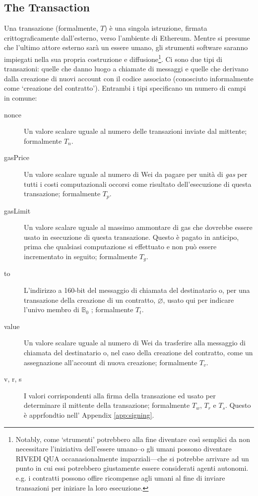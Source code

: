 \documentclass[9pt,oneside]{amsart}
\makeatletter
\newcommand*\eg{e.g.\@\xspace}
\makeatother
\begin{document}
\begin{multicols}{2}
\subsection{The Transaction} \label{ch:transaction}

Una transazione (formalmente, $T$) è una singola istruzione, firmata crittograficamente dall'esterno, verso l'ambiente di Ethereum. Mentre si presume che l'ultimo attore esterno sarà un essere umano, gli strumenti software saranno impiegati nella sua propria costruzione e diffusione\footnote{Notably, come `strumenti' potrebbero alla fine diventare così semplici da non necessitare l'iniziativa dell'essere umano--o gli umani possono diventare RIVEDI QUA occanasionalmente imparziali---che si potrebbe arrivare ad un punto in cui essi potrebbero giustamente essere considerati agenti autonomi. \eg i contratti possono offire ricompense agli umani al fine di inviare transazioni per iniziare la loro esecuzione.}. Ci sono due tipi di transazioni: quelle che danno luogo a chiamate di messaggi e quelle che derivano dalla creazione di nuovi account con il codice associato (conosciuto informalmente come `creazione del contratto'). Entrambi i tipi specificano un numero di campi in comune:

\begin{description}
\item[nonce] Un valore scalare uguale al numero delle transazioni inviate dal mittente; formalmente $T_n$.
\item[gasPrice] Un valore scalare uguale al numero di Wei da pagare per unità di \textit{gas} per tutti i costi computazionali occorsi come risultato dell'esecuzione di questa transazione; formalmente $T_p$.
\item[gasLimit] Un valore scalare uguale al massimo ammontare di gas che dovrebbe essere usato in esecuzione di questa transazione. Questo è pagato in anticipo, prima che qualsiasi computazione si effettuato e non può essere incrementato in seguito; formalmente $T_g$.
\item[to] L'indirizzo a 160-bit del messaggio di chiamata del destinatario o, per una transazione della creazione di un contratto, $\varnothing$, usato qui per indicare l'univo membro di $\mathbb{B}_0$ ; formalmente $T_t$.
\item[value] Un valore scalare uguale al numero di Wei da trasferire alla messaggio di chiamata del destinatario o, nel caso della creazione del contratto, come un assegnazione all'account di nuova creazione; formalmente $T_v$.
\item[v, r, s] I valori corrispondenti alla firma della transazione ed usato per determinare il mittente della transazione; formalmente $T_w$, $T_r$ e $T_s$. Questo è apprfondtio nell' Appendix \ref{app:signing}.
\end{description}


\end{multicols}
\end{document}
